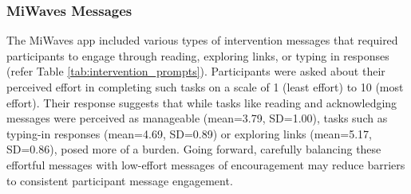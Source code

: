 

\subsubsection{MiWaves Messages}
The MiWaves app included various types of intervention messages that required participants to engage through reading, exploring links, or typing in responses
(refer Table \ref{tab:intervention_prompts}). 
Participants were asked about their perceived effort in completing such tasks on a scale of 1 (least effort) to 10 (most effort). Their response suggests that while tasks like reading and acknowledging messages were perceived as manageable (mean=3.79, SD=1.00), tasks such as typing-in responses (mean=4.69, SD=0.89) or exploring links (mean=5.17, SD=0.86), posed more of a burden. Going forward, carefully balancing these effortful messages with low-effort messages of encouragement may reduce barriers to consistent participant message engagement.

